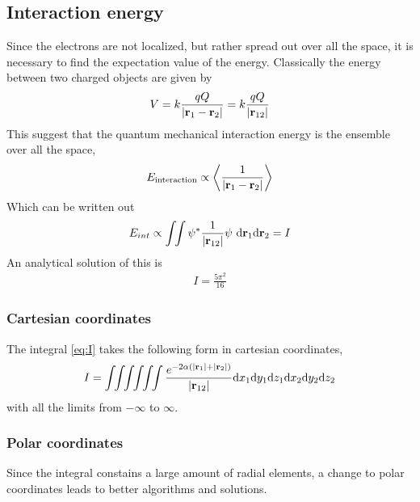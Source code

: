 \documentclass[11pt,a4paper,english,final]{article}
\numberwithin{equation}{section}
\newcommand{\conj}[1]{#1^*}
\newcommand{\ve}[1]{\mathbf{#1}} %
\newcommand{\di}{\mathrm{d}}
\begin{document}
\subsection{Interaction energy}

Since the electrons are not localized, but rather spread out over all the 
space, it is necessary to find the expectation value of the energy. 
Classically the energy between two charged objects are given by
\begin{gather}
V = k\frac{qQ}{\abs{\ve{r}_1 - \ve{r}_2}} = k\frac{qQ}{\abs{\ve{r}_{12}}}
\end{gather}
This suggest that the quantum mechanical interaction energy is the 
ensemble over all the space,
\begin{gather}
E_{\text{interaction}} \propto  
\expval{\frac{1}{\abs{\ve{r}_1 - \ve{r}_2}}}
\end{gather}
Which can be written out 
\begin{gather}
E_{int} \propto \int\!\! \int \conj{\psi} 
\frac{1}{\abs{\ve{r}_{12}}} \psi 
\,\, \di\ve{r}_1\di\ve{r}_2 = I
\label{eq:I}
\end{gather}
An analytical solution of this is
\begin{gather}
I = \frac{5\pi^2}{16}
\end{gather}



\subsubsection{Cartesian coordinates}

The integral \eqref{eq:I} takes the following form in cartesian 
coordinates,
\begin{gather} I = 
\int\!\!\int\!\!\int\!\!\int\!\!\int\!\!\int
\frac{e^{-2\alpha\left(\abs{\ve{r}_1} + \abs{\ve{r}_2 }\right)}
}{\abs{\ve{r}_{12}}}
\di x_1\di y_1\di z_1\di x_2\di y_2\di z_2
\label{eq:IC}
\end{gather}
with all the limits from $-\infty$ to $\infty$. 


\subsubsection{Polar coordinates}
Since the integral constains a large amount of radial elements,
a change to polar coordinates leads to 
better algorithms and solutions.
\end{document}
